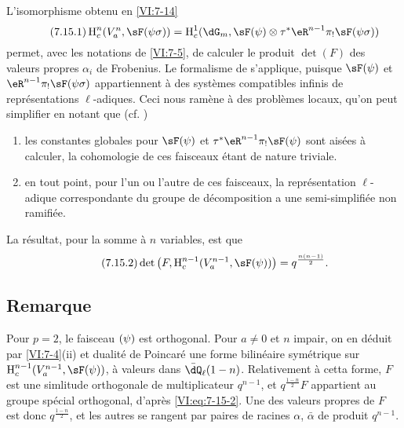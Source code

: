 L'isomorphisme obtenu en \ref{VI:7-14} 
\begin{equation*}\tag{7.15.1}\label{VI:eq:7-15-1}
  \h_c^n(V_a^n,\sF(\psi\sigma)) = \h_c^1(\dG_m,\sF(\psi)\otimes \tau^\ast \eR^{n-1} \pi_! \sF(\psi\sigma)) 
\end{equation*}
permet, avec les notations de \ref{VI:7-5}, de calculer le produit $\det(F)$ 
des valeurs propres $\alpha_i$ de Frobenius. Le formalisme de \cite{de73} 
s'applique, puisque $\sF(\psi)$ et $\eR^{n-1} \pi_! \sF(\psi\sigma)$ 
appartiennent \`a des syst\`emes compatibles infinis de repr\'esentations 
$\ell$-adiques. Ceci nous ram\`ene \`a des probl\`emes locaux, qu'on peut 
simplifier en notant que (cf. \cite[9.5]{de73}) 
\begin{enumerate}[\indent a)]
  \item les constantes globales pour 
    $\sF(\psi)$ et $\tau^\ast \eR^{n-1} \pi_! \sF(\psi)$ sont ais\'ees \`a 
    calculer, la cohomologie de ces faisceaux \'etant de nature triviale. 
  \item en tout point, pour l'un ou l'autre de ces faisceaux, la 
    repr\'esentation $\ell$-adique correspondante du groupe de d\'ecomposition 
    a une semi-simplifi\'ee non ramifi\'ee. 
\end{enumerate}

La r\'esultat, pour la somme \`a $n$ variables, est que 
\begin{equation*}\tag{7.15.2}\label{VI:eq:7-15-2}
  \det\left(F,\h_c^{n-1}(V_a^{n-1},\sF(\psi))\right) = q^{\frac{n(n-1)}{2}} \text{.} 
\end{equation*}





\subsection{Remarque}\label{VI:7-16}

Pour $p=2$, le faisceau $\sf(\psi)$ est orthogonal. Pour $a\ne 0$ et $n$ 
impair, on en d\'eduit par \ref{VI:7-4}(ii) et dualit\'e de Poincar\'e une 
forme bilin\'eaire sym\'etrique sur $\h_c^{n-1}(V_a^{n-1},\sF(\psi))$, \`a 
valeurs dans $\bar\dQ_\ell(1-n)$. Relativement \`a cetta forme, $F$ est une 
simlitude orthogonale de multiplicateur $q^{n-1}$, et $q^{\frac{1-n}{2}} F$ 
appartient au groupe sp\'ecial orthogonal, d'apr\`es \eqref{VI:eq:7-15-2}. Une 
des valeurs propres de $F$ est donc $q^{\frac{1-n}{2}}$, et les autres se 
rangent par paires de racines $\alpha$, $\bar\alpha$ de produit $q^{n-1}$. 

